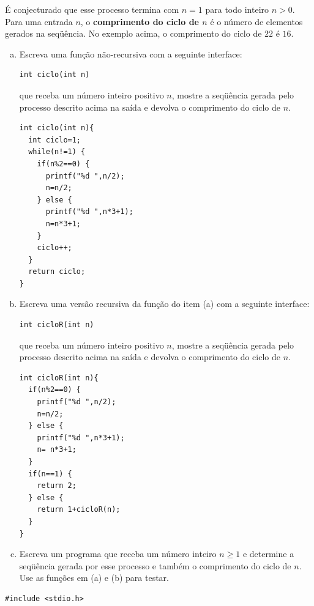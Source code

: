 \documentclass[a4paper,10pt]{article}
\begin{document}
\begin{enumerate}
É conjecturado que esse processo termina com $n = 1$ para todo inteiro $n > 0$.
Para uma entrada $n$, o \textbf{comprimento do ciclo de $n$} é o número de elementos gerados na seqüência.
No exemplo acima, o comprimento do ciclo de $22$ é $16$. 

\begin{enumerate}[(a)]
  \item Escreva uma função não-recursiva com a seguinte interface:

\begin{lstlisting}
int ciclo(int n)
\end{lstlisting}

que receba um número inteiro positivo $n$, mostre a seqüência gerada pelo processo descrito acima 
na saída e devolva o comprimento do ciclo de $n$. 

\begin{lstlisting}
int ciclo(int n){
  int ciclo=1;
  while(n!=1) {
    if(n%2==0) {
      printf("%d ",n/2);
      n=n/2;
    } else {
      printf("%d ",n*3+1);
      n=n*3+1;
    }
    ciclo++;
  }
  return ciclo;
}
\end{lstlisting}

\pagebreak

\item Escreva uma versão recursiva da função do item (a) com a seguinte interface: 

\begin{lstlisting}
int cicloR(int n)
\end{lstlisting}

que receba um número inteiro positivo $n$, mostre a seqüência gerada pelo processo descrito 
acima na saída e devolva o comprimento do ciclo de $n$.

\begin{lstlisting}
int cicloR(int n){
  if(n%2==0) {
    printf("%d ",n/2);
    n=n/2;
  } else {
    printf("%d ",n*3+1);
    n= n*3+1;
  }
  if(n==1) {
    return 2;
  } else {
    return 1+cicloR(n);
  }
}
\end{lstlisting}
\pagebreak

\item Escreva um programa que receba um número inteiro $n \geq 1$ e determine a seqüência gerada 
por esse processo e também o comprimento do ciclo de $n$. Use as funções em (a) e (b) para testar. 
\end{enumerate}

\begin{lstlisting}
#include <stdio.h>


\end{lstlisting}
\end{enumerate}
\end{document}
